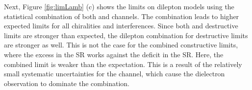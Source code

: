 Next, Figure \ref{fig:limLamb} (c) shows the limits on dilepton models using the statistical combination of both \ee and \mm channels.
The combination leads to higher expected limits for all chiralities and interferences.
Since both \ee and \mm destructive limits are stronger than expected, the dilepton combination for destructive limits are stronger as well.
This is not the case for the combined constructive limits, where the excess in the \ee SR works against the deficit in the \mm SR.
Here, the combined limit is weaker than the expectation.
This is a result of the relatively small systematic uncertainties for the \ee channel, which cause the dielectron observation to dominate the combination.

